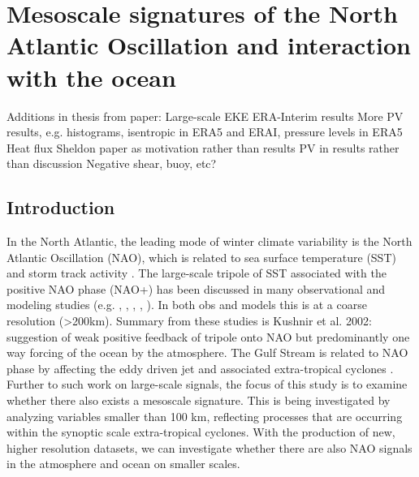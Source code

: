 \chapter{Mesoscale signatures of the North Atlantic Oscillation and interaction with the ocean}

\graphicspath{{Chapter4/Figs/}}



Additions in thesis from paper:
Large-scale EKE
ERA-Interim results
More PV results, e.g. histograms, isentropic in ERA5 and ERAI, pressure levels in ERA5
Heat flux
Sheldon paper as motivation rather than results
PV in results rather than discussion
Negative shear, buoy, etc?



\section{Introduction}

In the North Atlantic, the leading mode of winter climate variability is the North Atlantic Oscillation (NAO), which is related to sea surface temperature (SST) and storm track activity \citep{vallis2008local}. The large-scale tripole of SST associated with the positive NAO phase (NAO+) has been discussed in many observational and modeling studies (e.g. \citet{bjerknes1964atlantic}, \citet{wallace1987observed}, \citet{czaja2001observations}, \citet{peng2002north}, \citet{visbeck2003ocean}). In both obs and models this is at a coarse resolution (>200km). Summary from these studies is Kushnir et al. 2002: suggestion of weak positive feedback of tripole onto NAO but predominantly one way forcing of the ocean by the atmosphere. The Gulf Stream is related to NAO phase by affecting the eddy driven jet and associated extra-tropical cyclones \citep{sampe2010significance, nakamura2008importance, booth2012sensitivity, small2014storm, woollings2012response, vanniere2017contribution, vanniere2017cold}. Further to such work on large-scale signals, the focus of this study is to examine whether there also exists a mesoscale signature. This is being investigated by analyzing variables smaller than 100 km, reflecting processes that are occurring within the synoptic scale extra-tropical cyclones. With the production of new, higher resolution datasets, we can investigate whether there are also NAO signals in the atmosphere and ocean on smaller scales. 

